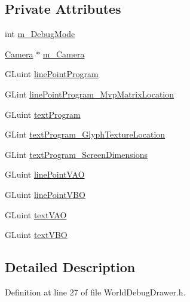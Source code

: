 \subsection*{Private Attributes}
\begin{DoxyCompactItemize}
\item 
int \mbox{\hyperlink{classnjli_1_1_world_debug_drawer_a1531502ece9afabebbf772bcc25f2811}{m\+\_\+\+Debug\+Mode}}
\item 
\mbox{\hyperlink{classnjli_1_1_camera}{Camera}} $\ast$ \mbox{\hyperlink{classnjli_1_1_world_debug_drawer_a5c7be82eaa6a728ef956351320198d3e}{m\+\_\+\+Camera}}
\item 
G\+Luint \mbox{\hyperlink{classnjli_1_1_world_debug_drawer_ada80b31b5782b0bf85943e0d5c075c0b}{line\+Point\+Program}}
\item 
G\+Lint \mbox{\hyperlink{classnjli_1_1_world_debug_drawer_ab439977d5e3cfe2efc6f3b5445e0fd87}{line\+Point\+Program\+\_\+\+Mvp\+Matrix\+Location}}
\item 
G\+Luint \mbox{\hyperlink{classnjli_1_1_world_debug_drawer_a0d63f957bea4ad8e5306d680bb2ea8e8}{text\+Program}}
\item 
G\+Lint \mbox{\hyperlink{classnjli_1_1_world_debug_drawer_a2b7b2612853759b92ad26de37ebe8dd1}{text\+Program\+\_\+\+Glyph\+Texture\+Location}}
\item 
G\+Lint \mbox{\hyperlink{classnjli_1_1_world_debug_drawer_a8afce071c7a5a29b378bb807f1dbdf3f}{text\+Program\+\_\+\+Screen\+Dimensions}}
\item 
G\+Luint \mbox{\hyperlink{classnjli_1_1_world_debug_drawer_a61e7e986d55c6348ba96b60406e6d3c1}{line\+Point\+V\+AO}}
\item 
G\+Luint \mbox{\hyperlink{classnjli_1_1_world_debug_drawer_a731ef5fbc59334c0bf3f0a0ee4ce88ee}{line\+Point\+V\+BO}}
\item 
G\+Luint \mbox{\hyperlink{classnjli_1_1_world_debug_drawer_a8a7f7e44c3a3ba9a1bca6c2d660f3a9d}{text\+V\+AO}}
\item 
G\+Luint \mbox{\hyperlink{classnjli_1_1_world_debug_drawer_a1911a5f2cdd6f0b66480883d9880ba42}{text\+V\+BO}}
\end{DoxyCompactItemize}


\subsection{Detailed Description}


Definition at line 27 of file World\+Debug\+Drawer.\+h.



